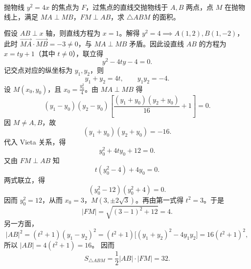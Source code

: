 \begin{example}[抹茶T3]
    抛物线 $y^2=4x$ 的焦点为 $F$，过焦点的直线交抛物线于 $A,B$ 两点，点 $M$ 在抛物线上，满足 $MA\perp MB$，$FM\perp AB$，求 $\triangle ABM$ 的面积。
\end{example}
\begin{solution}
    假设 $AB \perp x$ 轴，则直线方程为 $x = 1$。解得 $y^2 = 4 \implies A(1, 2), B(1, -2)$，此时 $\overrightarrow{MA} \cdot \overrightarrow{MB} = -3 \neq 0$，与 $MA \perp MB$ 矛盾。因此设直线 $AB$ 的方程为 $x = ty + 1$（其中 $t \neq 0$），联立得
    \[
    y^2-4ty-4=0.
    \]
    记交点对应的纵坐标为 $y_1,y_2$，则
    \[
    y_1+y_2=4t,\qquad y_1y_2=-4.
    \]
    设 $M(x_0,y_0)$，且 $x_0=\frac{y_0^2}{4}$。由 $MA\perp MB$ 得
    \[
    (y_1-y_0)(y_2-y_0)\left[\frac{(y_1+y_0)(y_2+y_0)}{16}+1\right]=0.
    \]
    因 $M\neq A,B$，故
    \[
    (y_1+y_0)(y_2+y_0)=-16.
    \]
    代入 Vieta 关系，得
    \[
    y_0^2+4ty_0+12=0.
    \]
    又由 $FM\perp AB$ 知
    \[
    t(y_0^2-4)+4y_0=0.
    \]
    两式联立，得
    \[
    (y_0^2-12)(y_0^2+4)=0.
    \]
    因而 $y_0^2=12$，从而 $x_0=3$，$M(3,\pm2\sqrt3)$。再由第一式得 $t^2=3$。于是
    \[
    |FM|=\sqrt{(3-1)^2+12}=4.
    \]
    另一方面，
    \[
    |AB|^2=(t^2+1)(y_1-y_2)^2=(t^2+1)\big[(y_1+y_2)^2-4y_1y_2\big]=16(t^2+1)^2,
    \]
    所以 $|AB|=4(t^2+1)=16$。
    因而
    \[
    S_{\triangle ABM}=\frac12|AB|\cdot|FM|=32.
    \]
\end{solution}

